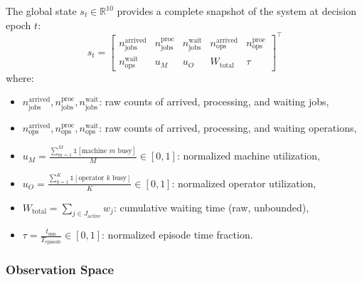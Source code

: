 The global state \( s_t \in \mathbb{R}^{10} \) provides a complete snapshot of the system at decision epoch \( t \):
\begin{equation}
s_t = \begin{bmatrix}
n_{\text{jobs}}^{\text{arrived}} & n_{\text{jobs}}^{\text{proc}} & n_{\text{jobs}}^{\text{wait}} & n_{\text{ops}}^{\text{arrived}} & n_{\text{ops}}^{\text{proc}} \\
n_{\text{ops}}^{\text{wait}} & u_M & u_O & W_{\text{total}} & \tau
\end{bmatrix}^\top
\end{equation}
where:
\begin{itemize}
    \item \( n_{\text{jobs}}^{\text{arrived}}, n_{\text{jobs}}^{\text{proc}}, n_{\text{jobs}}^{\text{wait}} \): raw counts of arrived, processing, and waiting jobs,
    \item \( n_{\text{ops}}^{\text{arrived}}, n_{\text{ops}}^{\text{proc}}, n_{\text{ops}}^{\text{wait}} \): raw counts of arrived, processing, and waiting operations,
    \item \( u_M = \frac{\sum_{m=1}^{M} \mathbb{1}[\text{machine } m \text{ busy}]}{M} \in [0,1] \): normalized machine utilization,
    \item \( u_O = \frac{\sum_{k=1}^{K} \mathbb{1}[\text{operator } k \text{ busy}]}{K} \in [0,1] \): normalized operator utilization,
    \item \( W_{\text{total}} = \sum_{j \in J_{\text{active}}} w_j \): cumulative waiting time (raw, unbounded),
    \item \( \tau = \frac{t_{\text{sim}}}{T_{\text{episode}}} \in [0,1] \): normalized episode time fraction.
\end{itemize}

\subsubsection{Observation Space}

